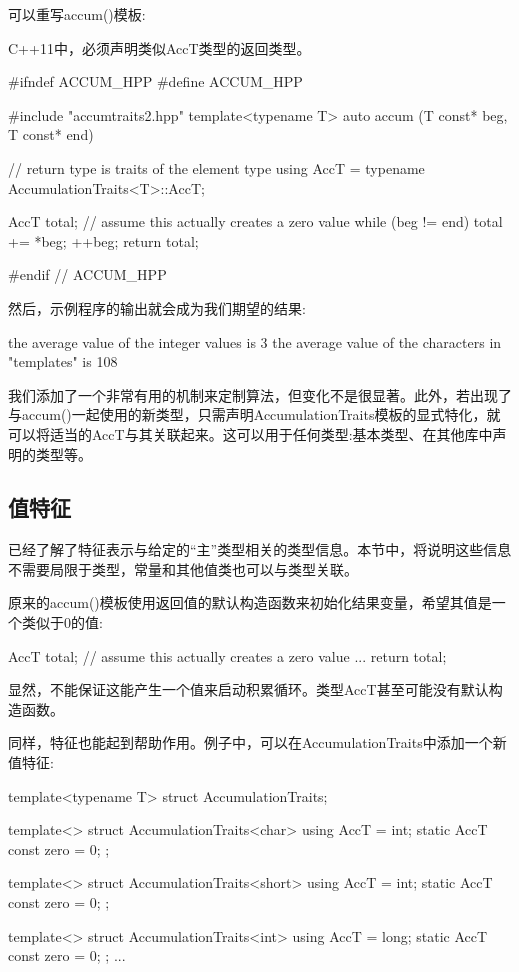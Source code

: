 可以重写accum()模板:

\begin{notice}
C++11中，必须声明类似AccT类型的返回类型。
\end{notice}

\begin{cpp}
#ifndef ACCUM_HPP
#define ACCUM_HPP

#include "accumtraits2.hpp"
template<typename T>
auto accum (T const* beg, T const* end)
{
	// return type is traits of the element type
	using AccT = typename AccumulationTraits<T>::AccT;
	
	AccT total{}; // assume this actually creates a zero value
	while (beg != end) {
		total += *beg;
		++beg;
	}
	return total;
}

#endif // ACCUM_HPP
\end{cpp}

然后，示例程序的输出就会成为我们期望的结果:

\begin{shell}
the average value of the integer values is 3
the average value of the characters in "templates" is 108
\end{shell}

我们添加了一个非常有用的机制来定制算法，但变化不是很显著。此外，若出现了与accum()一起使用的新类型，只需声明AccumulationTraits模板的显式特化，就可以将适当的AccT与其关联起来。这可以用于任何类型:基本类型、在其他库中声明的类型等。

\subsection{值特征}

已经了解了特征表示与给定的“主”类型相关的类型信息。本节中，将说明这些信息不需要局限于类型，常量和其他值类也可以与类型关联。

原来的accum()模板使用返回值的默认构造函数来初始化结果变量，希望其值是一个类似于0的值:

\begin{cpp}
AccT total{}; // assume this actually creates a zero value
...
return total;
\end{cpp}

显然，不能保证这能产生一个值来启动积累循环。类型AccT甚至可能没有默认构造函数。

同样，特征也能起到帮助作用。例子中，可以在AccumulationTraits中添加一个新值特征:

\begin{cpp}
template<typename T>
struct AccumulationTraits;

template<>
struct AccumulationTraits<char> {
	using AccT = int;
	static AccT const zero = 0;
};

template<>
struct AccumulationTraits<short> {
	using AccT = int;
	static AccT const zero = 0;
};

template<>
struct AccumulationTraits<int> {
	using AccT = long;
	static AccT const zero = 0;
};
...
\end{cpp}

